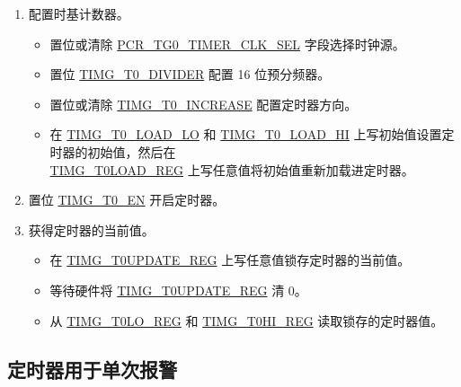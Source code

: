 \documentclass[main\_\_CN.tex]{subfiles}
\begin{document}
\begin{enumerate}
    \item 配置时基计数器。
        \begin{itemize}
        \item 置位或清除 \hyperref[fielddesc:PCRTG0TIMERCLKSEL]{PCR\_TG0\_TIMER\_CLK\_SEL} 字段选择时钟源。
        \item 置位 \hyperref[fielddesc:TIMGTXDIVIDER]{TIMG\_T0\_DIVIDER} 配置 16 位预分频器。
        \item 置位或清除 \hyperref[fielddesc:TIMGTXINCREASE]{TIMG\_T0\_INCREASE} 配置定时器方向。
        \item 在 \hyperref[fielddesc:TIMGTXLOADLO]{TIMG\_T0\_LOAD\_LO} 和 \hyperref[fielddesc:TIMGTXLOADHI]{TIMG\_T0\_LOAD\_HI} 上写初始值设置定时器的初始值，然后在 \\\hyperref[regdesc:TIMGTXLOADREG]{TIMG\_T0LOAD\_REG} 上写任意值将初始值重新加载进定时器。
    \end{itemize}
    \item 置位 \hyperref[fielddesc:TIMGTXEN]{TIMG\_T0\_EN} 开启定时器。
    \item 获得定时器的当前值。
    \begin{itemize}
        \item 在 \hyperref[regdesc:TIMGTXUPDATEREG]{TIMG\_T0UPDATE\_REG} 上写任意值锁存定时器的当前值。
        \item 等待硬件将 \hyperref[regdesc:TIMGTXUPDATEREG]{TIMG\_T0UPDATE\_REG} 清 0。
        \item 从 \hyperref[regdesc:TIMGTXLOREG]{TIMG\_T0LO\_REG} 和 \hyperref[regdesc:TIMGTXHIREG]{TIMG\_T0HI\_REG} 读取锁存的定时器值。
    \end{itemize}
\end{enumerate}

\subsection{定时器用于单次报警}
\label{sec:timg-func-descr-timer-alarm}
\end{document}
